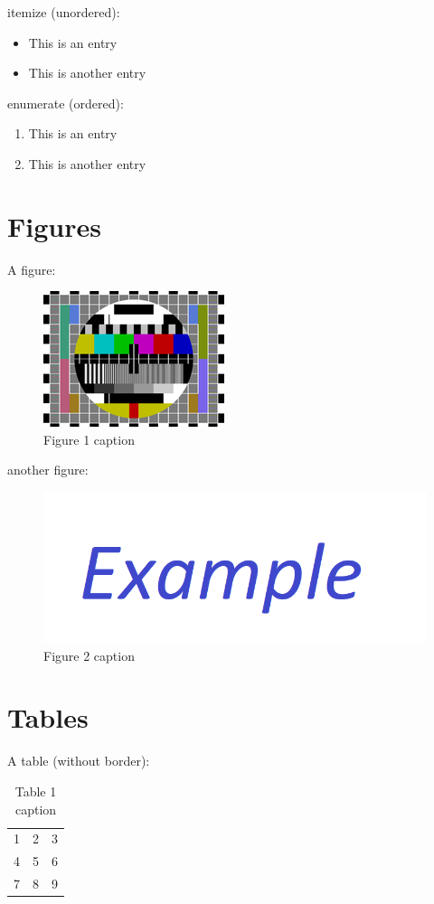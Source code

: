 itemize (unordered):
\begin{itemize}
    \item This is an entry
    \item This is another entry
\end{itemize}
enumerate (ordered):
\begin{enumerate}
    \item This is an entry
    \item This is another entry
\end{enumerate}

\section{Figures}

A figure:
\begin{figure}[H]
    \centering
    \includegraphics{figures/examples/example1.png}
    \caption{Figure 1 caption}\label{figure_example1}
\end{figure}

another figure:
\begin{figure}[H]
    \centering
    \includegraphics{figures/examples/example2.png}
    \caption{Figure 2 caption}\label{figure_example2}
\end{figure}

\section{Tables}

A table (without border):
\begin{table}[H]
    \centering
    \begin{tabular}{ l c r }\hline
        1 & 2 & 3 \\
        4 & 5 & 6 \\
        7 & 8 & 9 \\
    \end{tabular}
    \caption{Table 1 caption}\label{tables_table1}
\end{table}

